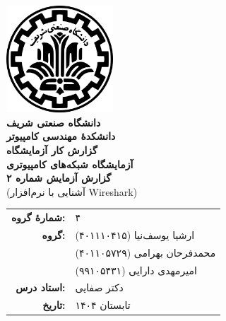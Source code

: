 \documentclass[12pt]{article}
\newcommand{\persianordinal}[1]{%
	\ifcase#1
	\or اول%
	\or دوم%
	\or سوم%
	\or چهارم%
	\or پنجم%
	\or ششم%
	\or هفتم%
	\or هشتم%
	\or نهم%
	\or دهم%
	\or یازدهم%
	\or دوازدهم%
	\or سیزدهم%
	\or چهاردهم%
	\or پانزدهم%
	\or شانزدهم%
	\or هفدهم%
	\or هجدهم%
	\or نوزدهم%
	\or بیستم%
	\else #1\fi
}
\newcommand{\persianordinalpage}{\persianfont\persianordinal{\value{page}}}
\begin{document}
	
	\begin{titlepage}
		\centering
		\vspace*{1cm}
		\includegraphics[width=4cm]{sharif.png}\\[1.5cm]
		{\Large\textbf{دانشگاه صنعتی شریف}}\\[0.5cm]
		{\large\textbf{دانشکدهٔ مهندسی کامپیوتر}}\\[1.5cm]
		{\Huge\textbf{گزارش کار آزمایشگاه}}\\[0.5cm]
		{\LARGE\textbf{آزمایشگاه شبکه‌های کامپیوتری}}\\[2cm]
		
		\textbf{گزارش آزمایش شماره ۲}\\
		(آشنایی با نرم‌افزار \textenglish{Wireshark})
		
		\vfill
		\begin{tabular}{rl}
			\textbf{شمارهٔ گروه:} & ۴ \\
			\textbf{گروه:} &
			ارشیا یوسف‌نیا (۴۰۱۱۱۰۴۱۵) \\
			& محمد‌فرحان بهرامی (۴۰۱۱۰۵۷۲۹) \\
			& امیرمهدی دارایی (۹۹۱۰۵۴۳۱) \\
			\textbf{استاد درس:} & دکتر صفایی \\
			\textbf{تاریخ:} & تابستان ۱۴۰۴ \\
		\end{tabular}
	\end{titlepage}
	
	\clearpage
	\setcounter{page}{1}
	\renewcommand{\thepage}{\persianordinalpage}
	
	\tableofcontents
	\clearpage
	\listoffigures
	\clearpage
	\listoftables
	
	\clearpage
	\setcounter{page}{1}
	\renewcommand{\thepage}{\persianfont\arabic{page}}
	
	
\end{document}
